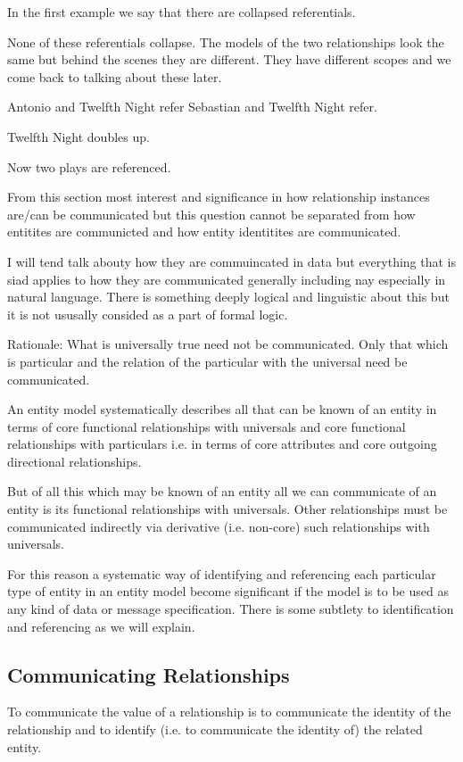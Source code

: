In the first example we say that there are collapsed referentials. 

None of these referentials collapse. The models of the two relationships
look the same but behind the scenes they are different. They have different scopes and we come back to talking about these later.

Antonio and Twelfth Night refer
Sebastian and Twelfth Night refer.

Twelfth Night doubles up.

Now two plays are referenced.

\mynote From this section most interest and significance  in how relationship instances are/can be communicated but this question cannot be separated from how entitites are communicted and how entity identitites are communicated.

\mynote I will tend talk abouty how they are commuincated in data but everything that is siad applies to how they are communicated generally including nay especially in natural language. There is something deeply logical and linguistic about this but it is not ususally consided as a part of formal logic.

\mynote Rationale: What is universally true need not be communicated. Only that which is particular and the relation of the particular with the universal need be communicated. 

\mynote An entity model systematically describes all that can be known of an entity
in terms of core functional relationships with universals and core functional relationships with particulars i.e. in terms of core attributes and core outgoing directional relationships.

\mynote But of all this which  may be known of an entity all we can communicate of an entity is its functional relationships with universals. Other relationships must be communicated indirectly via derivative (i.e. non-core) such relationships with universals. 

\mynote For this reason a systematic way of identifying and referencing each particular type  of entity in an entity model become significant if the model is to be used as any kind of data or message specification. There is some subtlety to identification and referencing as we will explain.

\subsection*{Communicating Relationships}
\mynote To communicate the value of a relationship is to communicate the identity of the relationship and to identify (i.e. to communicate the identity of) the related entity. 

